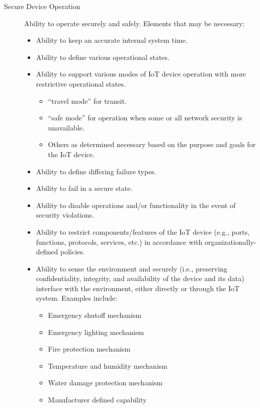 \begin{description}
        \item[Secure Device Operation] Ability to operate securely and safely. Elements that may be necessary:
        \begin{itemize}
            \item Ability to keep an accurate internal system time.
            \item Ability to define various operational states.
            \item Ability to support various modes of IoT device operation with more restrictive operational states.
            \begin{itemize}
                \item “travel mode” for transit.
                \item “safe mode” for operation when some or all network security is unavailable.
                \item Others as determined necessary based on the purpose and goals for the IoT device.
            \end{itemize}
            \item Ability to define differing failure types.
            \item Ability to fail in a secure state.
            \item Ability to disable operations and/or functionality in the event of security violations.
            \item Ability to restrict components/features of the IoT device (e.g., ports, functions, protocols, services, etc.) in accordance with organizationally-defined policies.
            \item Ability to sense the environment and securely (i.e., preserving confidentiality, integrity, and availability of the device and its data) interface with the environment, either directly or through the IoT system. Examples include:
            \begin{itemize}
                \item Emergency shutoff mechanism
                \item Emergency lighting mechanism
                \item Fire protection mechanism
                \item Temperature and humidity mechanism
                \item Water damage protection mechanism
                \item Manufacturer defined capability
            \end{itemize}
        \end{itemize}
        
        
    \end{description}
    
